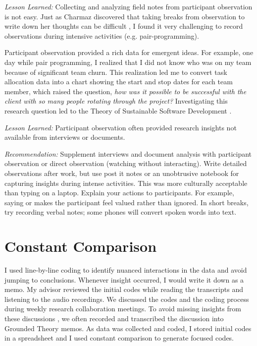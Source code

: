 
\textit{Lesson Learned:} Collecting and analyzing field notes from participant observation is not easy. Just as Charmaz discovered that taking breaks from observation to write down her thoughts can be difficult \cite{Charmaz}, I found it very challenging to record observations during intensive activities (e.g. pair-programming). 

Participant observation provided a rich data for emergent ideas. For example, one day while pair programming, I realized that I did not know who was on my team because of significant team churn. This realization led me to convert task allocation data into a chart showing the start and stop dates for each team member, which raised the question, \textit{how was it possible to be successful \cite{RalphDimensionsOfSuccess} with the client with so many people rotating through the project?} Investigating this research question led to the Theory of Sustainable Software Development \cite{SedanoSustainableSoftware}.

\textit{Lesson Learned:} Participant observation often provided research insights not available from interviews or documents.

\textit{Recommendation:} Supplement interviews and document analysis with participant observation or direct observation (watching without interacting). Write detailed observations after work, but use post it notes or an unobtrusive notebook for capturing insights during intense activities. This was more culturally acceptable than typing on a laptop. Explain your actions to participants. For example, saying  or  makes the participant feel valued rather than ignored. In short breaks, try recording verbal notes; some phones will convert spoken words into text.
\section{Constant Comparison}
\label{ConstantComparison}
I used line-by-line coding \cite{Charmaz} to identify nuanced interactions in the data and avoid jumping to conclusions. Whenever insight occurred, I would write it down as a memo. My advisor reviewed the initial codes while reading the transcripts and listening to the audio recordings. We discussed the codes and the coding process during weekly research collaboration meetings. To avoid missing insights from these discussions \cite{GlaserTheoreticalSensitivity}, we often recorded and transcribed the discussion into Grounded Theory memos. As data was collected and coded, I stored initial codes in a spreadsheet and I used constant comparison to generate focused codes.


